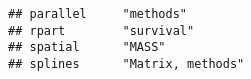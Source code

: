 \documentclass[]{book}
\begin{document}
\begin{verbatim}
## parallel     "methods"                                                                                                                                                                                                                                                                                                                                                                                                                                                                                                                                                                                                                                                                                                 
## rpart        "survival"                                                                                                                                                                                                                                                                                                                                                                                                                                                                                                                                                                                                                                                                                                
## spatial      "MASS"                                                                                                                                                                                                                                                                                                                                                                                                                                                                                                                                                                                                                                                                                                    
## splines      "Matrix, methods"                                                                                                                                                                                                                                                                                                                                                                                                                                                                                                                                                                                                                                                                                         

\end{verbatim}
\end{document}
